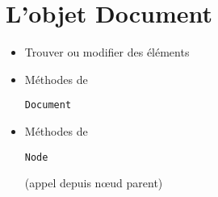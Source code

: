 \begin{otherlanguage}{english}

\end{otherlanguage}

\hypertarget{lobjet-document}{%
\section{L'objet Document}\label{lobjet-document}}

\begin{itemize}
\tightlist
\item
  Trouver ou modifier des éléments
\item
  Méthodes de
  \begin{otherlanguage}{english}\texttt{Document}\end{otherlanguage}
\end{itemize}

\begin{otherlanguage}{english}

\begin{Shaded}
\begin{Highlighting}[]
    \NormalTok{()}\OperatorTok{,} \NormalTok{()}\OperatorTok{,} \NormalTok{()}\OperatorTok{,}  
    \NormalTok{()}\OperatorTok{,} \NormalTok{()}
\end{Highlighting}
\end{Shaded}

\end{otherlanguage}

\begin{itemize}
\tightlist
\item
  Méthodes de
  \begin{otherlanguage}{english}\texttt{Node}\end{otherlanguage} (appel
  depuis nœud parent)
\end{itemize}

\begin{otherlanguage}{english}

\begin{Shaded}
\begin{Highlighting}[]
    \OperatorTok{,} \OperatorTok{,}
    \OperatorTok{,} \NormalTok{(}\OperatorTok{,}
\end{Highlighting}
\end{Shaded}

\end{otherlanguage}

